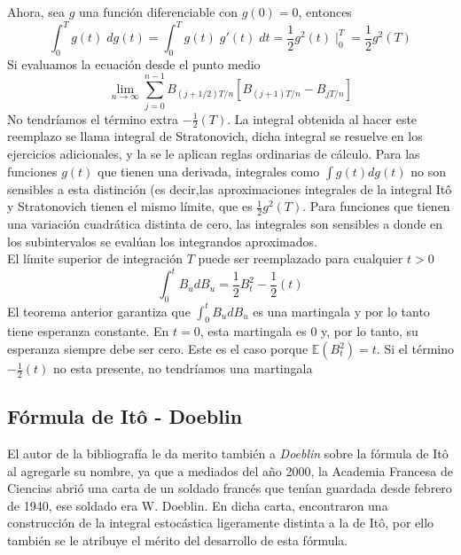 \documentclass[11pt,notitlepage]{article}
\begin{document}
Ahora, sea \(g\) una función diferenciable con \(g(0)=0\), entonces
\[\int_{0}^{T}g(t)\;dg(t)=\int_{0}^{T}g(t)\;g'(t)\;dt=\frac{1}{2}g^{2}(t)\mid_0^T=\frac{1}{2}g^{2}(T)\]
Si evaluamos la ecuación desde el punto medio
\[\lim_{n \to \infty}\sum_{j=0}^{n-1} B_{(j+1/2)T/n}[B_{(j+1)T/n}-B_{jT/n}]\]
No tendríamos el término extra \(-\frac{1}{2}(T)\). La integral obtenida al hacer este reemplazo se llama integral de Stratonovich, dicha integral se resuelve en los ejercicios adicionales, y la se le aplican reglas ordinarias de cálculo. Para las funciones \(g(t)\) que tienen una derivada, integrales como \(\int g (t) dg (t) \)
no son sensibles a esta distinción (es decir,las aproximaciones integrales de la integral Itô y Stratonovich tienen el mismo límite, que es \(\frac{1}{2}g^{2}(T)\). Para funciones que tienen una variación cuadrática distinta de cero, las integrales son sensibles a donde en
los subintervalos se evalúan los integrandos aproximados. \\
El límite superior de integración \(T\) puede ser reemplazado para cualquier \( t>0\)
\[\int_{0}^{t}B_udB_u=\frac{1}{2}B_t^2-\frac{1}{2}(t)\]
El teorema anterior garantiza que \(\int_{0}^{t}B_udB_u\) es una martingala y por lo tanto tiene esperanza constante. En  \(t = 0\), esta martingala es 0 y, por lo tanto, su esperanza siempre debe ser cero. Este es el caso porque \(\mathbb{E}(B^2_t)= t\). Si el término \(-\frac{1}{2}(t)\) no esta presente, no tendríamos una martingala
 




\subsection{Fórmula de Itô - Doeblin }
El autor de la bibliografía le da merito también a \textit{Doeblin} sobre la fórmula de Itô al agregarle su nombre, ya que a mediados del año 2000, la Academia Francesa de Ciencias abrió una carta de un soldado francés que tenían guardada desde febrero de 1940, ese soldado era W. Doeblin. En dicha carta, encontraron una construcción de la integral estocástica ligeramente distinta a la de Itô, por ello también se le atribuye el mérito del desarrollo de esta fórmula.
\end{document}
